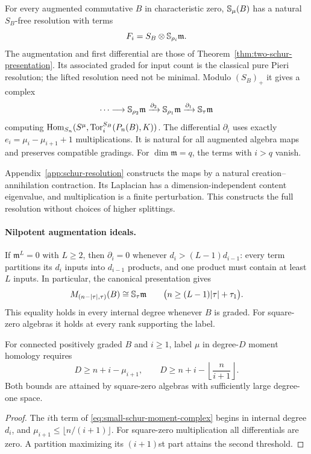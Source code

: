 \begin{theorem}
\label{thm:full-schur-resolution}
For every augmented commutative $B$ in characteristic zero,
$\mathbb S_\mu(B)$ has a natural $S_B$-free resolution with terms
\[
                       F_i=S_B\otimes\mathbb S_{\rho_i}\mathfrak m.
\]
The augmentation and first differential are those of
Theorem~\ref{thm:two-schur-presentation}. Its associated graded for
input count is the classical pure Pieri resolution; the lifted
resolution need not be minimal. Modulo $(S_B)_+$ it gives a complex
\begin{equation}\label{eq:small-schur-moment-complex}
 \cdots\longrightarrow\mathbb S_{\rho_2}\mathfrak m
 \xrightarrow{\partial_2}\mathbb S_{\rho_1}\mathfrak m
 \xrightarrow{\partial_1}\mathbb S_\tau\mathfrak m
\end{equation}
computing $\operatorname{Hom}_{S_n}(S^\mu,\operatorname{Tor}_i^{S_B}(P_n(B),K))$.
The differential $\partial_i$ uses exactly
$e_i=\mu_i-\mu_{i+1}+1$ multiplications. It is natural for all
augmented algebra maps and preserves compatible gradings.
For $\dim\mathfrak m=q$, the terms with $i>q$ vanish.
\end{theorem}

Appendix~\ref{app:schur-resolution} constructs the maps by a natural
creation--annihilation contraction. Its Laplacian has a
dimension-independent content eigenvalue, and multiplication is a
finite perturbation. This constructs the full resolution without choices
of higher splittings.

\paragraph{Nilpotent augmentation ideals.}
If $\mathfrak m^L=0$ with $L\ge2$, then $\partial_i=0$ whenever
$d_i>(L-1)d_{i-1}$: every term partitions its $d_i$ inputs into
$d_{i-1}$ products, and one product must contain at least $L$ inputs.
In particular, the canonical presentation gives
\[
 M_{(n-|\tau|,\tau)}(B)\cong\mathbb S_\tau\mathfrak m
 \qquad\bigl(n\ge(L-1)|\tau|+\tau_1\bigr).
\]
This equality holds in every internal degree whenever $B$ is graded.
For square-zero algebras it holds at every rank supporting the label.

\begin{corollary}
\label{cor:universal-schur-tor-support}
For connected positively graded $B$ and $i\ge1$, label $\mu$ in
degree-$D$ moment homology requires
\[
 D\ge n+i-\mu_{i+1},\qquad
 D\ge n+i-\left\lfloor\frac n{i+1}\right\rfloor.
\]
Both bounds are attained by square-zero algebras with sufficiently
large degree-one space.
\end{corollary}
\begin{proof}
The $i$th term of \eqref{eq:small-schur-moment-complex} begins in
internal degree $d_i$, and $\mu_{i+1}\le\lfloor n/(i+1)\rfloor$.
For square-zero multiplication all differentials are zero. A partition
maximizing its $(i+1)$st part attains the second threshold.
\end{proof}

